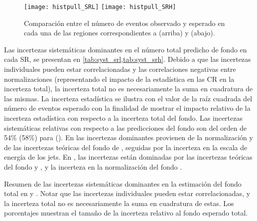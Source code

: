 \begin{figure}[!htbp]
  \centering

  \texttt{[image: histpull\_SRL]}
  \texttt{[image: histpull\_SRH]}

  \caption{Comparación entre el número de eventos observado y esperado en cada
    una de las regiones correspondientes a {\SRL} (arriba) y {\SRH} (abajo).}

  \label{fig:fit_region_composition}

\end{figure}


Las incertezas sistemáticas dominantes en el número total predicho de fondo en
cada SR, se presentan en \cref{tab:syst_srl,tab:syst_srh}.
Debido a que las incertezas individuales pueden estar correlacionadas y las
correlaciones negativas entre normalizaciones (representando el impacto de la
estadística en las CR en la incerteza total), la incerteza total no es
necesariamente la suma en cuadratura de las mismas. La incerteza estadística se
ilustra con el valor de la raíz cuadrada del número de eventos esperado con la
finalidad de mostrar el impacto relativo de la incerteza estadística con
respecto a la incerteza total del fondo. Las incertezas sistemáticas relativas
con respecto a las predicciones del fondo son del orden de 54\% (58\%) para
{\SRL} (\SRH). En {\SRL} las incertezas dominantes provienen de la normalización
y de las incertezas teóricas del fondo de {\ttgam}, seguidas por la incerteza en
la escala de energía de los jets. En {\SRH}, las
incertezas están dominadas por las incertezas teóricas del fondo {\zgam} y
{\gjet}, y la incerteza en la normalización del fondo {\wgam}.


\begin{table}[!htbp]
  \centering

  \caption{Resumen de las incertezas sistemáticas dominantes en la estimación del fondo total
    en {\SRL} y {\SRH}. Notar que las incertezas individuales pueden estar correlacionadas, y la incerteza
    total no es necesariamente la suma en cuadratura de estas. Los porcentajes muestran el tamaño
    de la incerteza relativo al fondo esperado total.}
  \label{tab:syst_srl}

  
\end{table}



